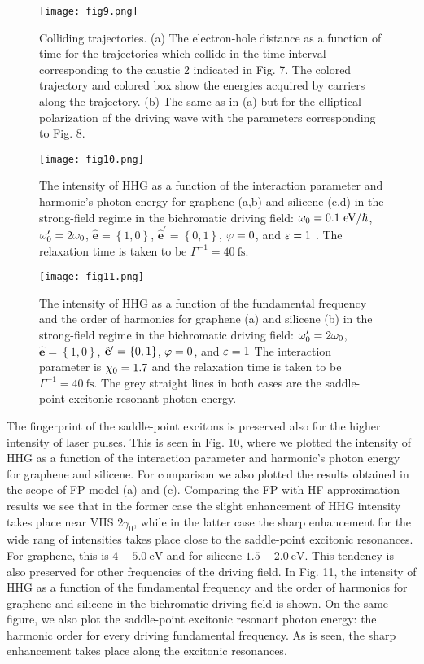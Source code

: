 \documentclass[reprint, superscriptaddress,  aps, pra]{revtex4-2}
\begin{document}
\begin{figure}[tbp]
\texttt{[image: fig9.png]}
\caption{Colliding trajectories. (a) The electron-hole distance as a
function of time for the trajectories which collide in the time interval
corresponding to the caustic 2 indicated in Fig. 7. The colored trajectory
and colored box show the energies acquired by carriers along the trajectory.
(b) The same as in (a) but for the elliptical polarization of the driving
wave with the parameters corresponding to Fig. 8.}
\end{figure}
\begin{figure}[tbp]
\texttt{[image: fig10.png]}
\caption{The intensity of HHG as a function of the interaction parameter and
harmonic's photon energy for graphene (a,b) and silicene (c,d) in the
strong-field regime in the bichromatic driving field: $\protect\omega %
_{0}=0.1\ \mathrm{eV}/\hbar $, $\protect\omega _{0}^{\prime }=2\protect%
\omega _{0}$, $\hat{\mathbf{e}}=\left\{ 1,0\right\} $, $\hat{\mathbf{e}}%
^{\prime }=\left\{ 0,1\right\} $, $\protect\varphi =0$, and $\protect%
\varepsilon =1$ . The relaxation time is taken to be $\Gamma ^{-1}=40\ 
\mathrm{fs.}$}
\end{figure}
\begin{figure}[tbp]
\texttt{[image: fig11.png]}
\caption{The intensity of HHG as a function of the fundamental frequency and
the order of harmonics for graphene (a) and silicene (b) in the strong-field
regime in the bichromatic driving field: $\protect\omega _{0}^{\prime }=2%
\protect\omega _{0}$, $\hat{\mathbf{e}}=\left\{ 1,0\right\} $, $\hat{\mathbf{%
e}}^{\prime }=\left\{ 0,1\right\} $, $\protect\varphi =0$, and $\protect%
\varepsilon =1$ The interaction parameter is $\protect\chi _{0}=1.7$ and the
relaxation time is taken to be $\Gamma ^{-1}=40\ \mathrm{fs.}$ The grey
straight lines in both cases are the saddle-point excitonic resonant photon
energy.}
\end{figure}

The fingerprint of the saddle-point excitons is preserved also for the
higher intensity of laser pulses. This is seen in Fig. 10, where we plotted
the intensity of HHG as a function of the interaction parameter and
harmonic's photon energy for graphene and silicene. For comparison we also
plotted the results obtained in the scope of FP model (a) and (c). Comparing
the FP with HF approximation results we see that in the former case the
slight enhancement of HHG intensity takes place near VHS $2\gamma _{0}$,
while in the latter case the sharp enhancement for the wide rang of
intensities takes place close to the saddle-point excitonic resonances. For
graphene, this is $4-5.0\ \mathrm{eV}$ and for silicene $1.5-2.0\ \mathrm{eV}
$. This tendency is also preserved for other frequencies of the driving
field. In Fig. 11, the intensity of HHG as a function of the fundamental
frequency and the order of harmonics for graphene and silicene in the
bichromatic driving field is shown. On the same figure, we also plot the
saddle-point excitonic resonant photon energy: the harmonic order for every
driving fundamental frequency. As is seen, the sharp enhancement takes place
along the excitonic resonances.
\end{document}
